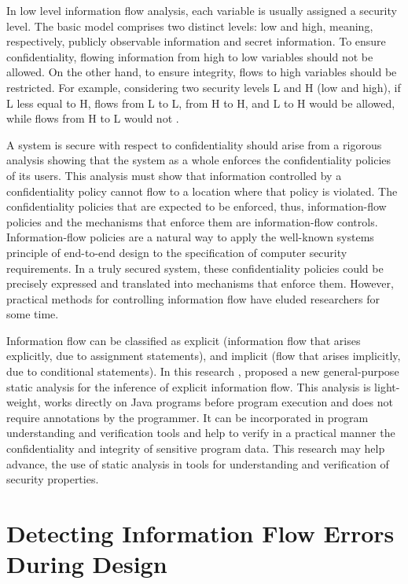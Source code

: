 In low level information flow analysis, each variable is usually assigned a security level. The basic model comprises two distinct levels: low and high, meaning, respectively, publicly observable information and secret information. To ensure confidentiality, flowing information from high to low variables should not be allowed. On the other hand, to ensure integrity, flows to high variables should be restricted. For example, considering two security levels L and H (low and high), if L less equal to H, flows from L to L, from H to H, and L to H would be allowed, while flows from H to L would not \cite{ref_88_smith2007principles}.

A system is secure with respect to confidentiality
should arise from a rigorous analysis showing that the system
as a whole enforces the confidentiality policies of its users.
This analysis must show that information controlled by a confidentiality policy cannot flow to a location where that policy
is violated. The confidentiality policies that are expected to be enforced, thus, information-flow policies and the mechanisms that
enforce them are information-flow controls. Information-flow
policies are a natural way to apply the well-known systems
principle of end-to-end design \cite{ref_89_saltzer1984end} to the specification of
computer security requirements. In a truly
secured system, these confidentiality policies could be precisely
expressed and translated into mechanisms that enforce them.
However, practical methods for controlling information flow
have eluded researchers for some time.

Information flow can be classified as explicit (information flow
that arises explicitly, due to assignment statements), and implicit
(flow that arises implicitly, due to conditional statements). In this research \cite{ref_90_liu2008static}, proposed a new general-purpose static analysis for the inference
of explicit information flow. This analysis is light-weight, works directly on Java programs before program execution and
does not require annotations by the programmer. It can be incorporated
in program understanding and verification tools and help to
verify in a practical manner the confidentiality and integrity of sensitive program data. This research may help advance, the use of static analysis in tools for understanding and verification of security properties.


\section{ Detecting Information Flow Errors During Design}

